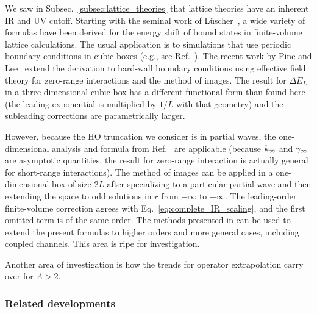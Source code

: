 	We saw in Subsec.~\ref{subsec:lattice_theories} that lattice theories
	have an inherent IR and UV cutoff.
	Starting with the seminal work of L\"uscher~\cite{Luscher:1985dn}, a
	wide variety of formulas have been derived for the energy shift of
	bound states in finite-volume lattice calculations.  The usual
	application is to simulations that use periodic boundary conditions in
	cubic boxes (e.g., see Ref.~\cite{Konig:2011ti}).  The recent work by
	Pine and Lee~\cite{Lee:2010km,Pine:2012zv} extend the derivation to
	hard-wall boundary conditions using effective field theory for
	zero-range interactions and the method of images.  The result for
	$\Delta E_L$ in a three-dimensional cubic box has a different
	functional form than found here (the leading exponential is multiplied
	by $1/L$ with that geometry) and the subleading corrections are
	parametrically larger.

	However, because the HO truncation we consider is in partial waves,
	the one-dimensional analysis and formula from Ref.~\cite{Pine:2012zv}
	are applicable (because $k_{\infty}$ and $\gamma_\infty$ are asymptotic quantities,
	the result for zero-range interaction is actually general for
	short-range interactions).  The method of images can be applied in a
	one-dimensional box of size $2L$ after specializing to a particular
	partial wave and then extending the space to odd solutions in $r$ from
	$-\infty$ to $+\infty$.  The leading-order finite-volume correction
	agrees with Eq.~\eqref{eq:complete_IR_scaling}, and the first omitted term
	is of the same order.
	The methods presented in \cite{Lee:2010km,Pine:2012zv}
	can be used to extend the present formulas to higher
	orders and more general cases, including coupled channels.  This area
	is ripe for investigation.

	Another area of investigation is how the trends for operator extrapolation
	carry over for $A > 2$.

	\medskip
	\subsubsection{Related developments}

